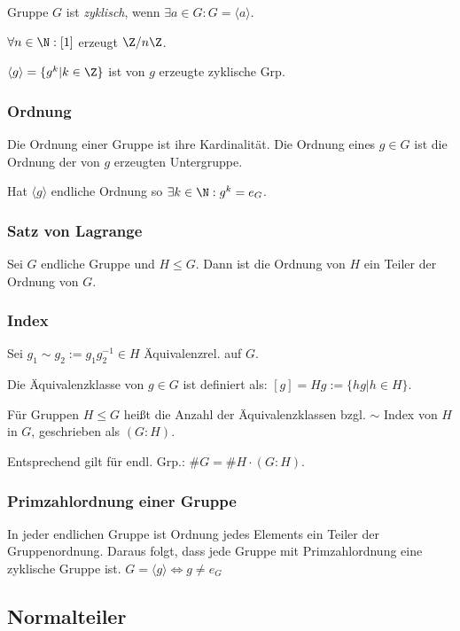 Gruppe $G$ ist \emph{zyklisch}, wenn $\exists a \in G : G = \langle a \rangle$.

$\forall n \in \N : [1]$ erzeugt $\Z / n\Z$.

$\langle g \rangle = \{ g^k | k \in \Z \}$ ist von $g$ erzeugte zyklische Grp.

\subsubsection*{Ordnung}

Die Ordnung einer Gruppe ist ihre Kardinalität. Die Ordnung eines $g \in G$ ist die Ordnung der von $g$ erzeugten Untergruppe.

Hat $\langle g \rangle$ endliche Ordnung so $\exists k \in \N : g^k = e_G$.

\subsubsection*{Satz von Lagrange}

Sei $G$ endliche Gruppe und $H \leq G$. Dann ist die Ordnung von $H$ ein Teiler der Ordnung von $G$.

\subsubsection*{Index}

Sei $g_1 \sim g_2 := g_1 g_2^{-1} \in H$ Äquivalenzrel. auf $G$.

Die Äquivalenzklasse von $g \in G$ ist definiert als: $[g] = Hg := \{ hg | h \in H\}$.

Für Gruppen $H \leq G$ heißt die Anzahl der Äquivalenzklassen bzgl. $\sim$ Index von $H$ in $G$, geschrieben als $(G : H)$.

Entsprechend gilt für endl. Grp.: $\#G = \#H \cdot (G : H)$.

\subsubsection*{Primzahlordnung einer Gruppe}

In jeder endlichen Gruppe ist Ordnung jedes Elements ein Teiler der Gruppenordnung. Daraus folgt, dass jede Gruppe mit Primzahlordnung eine zyklische Gruppe ist. $G = \langle g \rangle \iff g \neq e_G$

\subsection*{Normalteiler}

